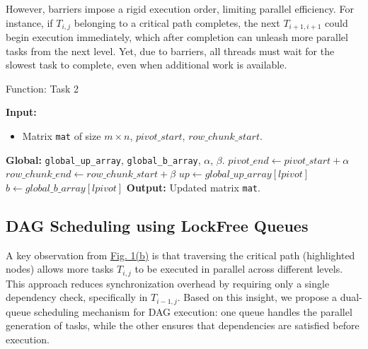 However, barriers impose a rigid execution order, limiting parallel efficiency. For instance, if \(T_{i,j}\) belonging to a critical path completes, the next \(T_{i+1,i+1}\) could begin execution immediately, which after completion can unleash more parallel tasks from the next level. Yet, due to barriers, all threads must wait for the slowest task to complete, even when additional work is available. 
\begin{algorithm}
	\caption{Function: Task 2}
	\label{alg:complete_task2}
	\begin{algorithmic}[1]
		\State \textbf{Input:} 
		\begin{itemize}
			\item Matrix \texttt{mat} of size $m\times n$, $pivot\_start$, $row\_chunk\_start$.
		\end{itemize}
		\State \textbf{Global:} \texttt{global\_up\_array}, \texttt{global\_b\_array}, \texttt{$\alpha$}, \texttt{$\beta$}.
		\State $pivot\_end \gets pivot\_start + \alpha $
		\State $row\_chunk\_end \gets row\_chunk\_start + \beta$
		\State \(up \gets global\_up\_array[lpivot]\)
		\State \(b \gets global\_b\_array[lpivot]\)
		\State {}
		\EndFor
		\EndFor
		\State \textbf{Output:} Updated matrix \texttt{mat}.
	\end{algorithmic}
\end{algorithm}
\subsection{DAG Scheduling using LockFree Queues}
\label{sec:proposed_alg}
A key observation from \hyperref[fig:task_graph]{Fig. 1(b)} is that traversing the critical path (highlighted nodes) allows more tasks \(T_{i,j}\) to be executed in parallel across different levels. This approach reduces synchronization overhead by requiring only a single dependency check, specifically in \(T_{i-1,j}\). Based on this insight, we propose a dual-queue scheduling mechanism for DAG execution: one queue handles the parallel generation of tasks, while the other ensures that dependencies are satisfied before execution.

